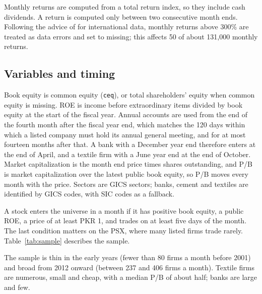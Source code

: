 \documentclass[11pt]{article}
\begin{document}
Monthly returns are computed from a total return index, so they include cash dividends. A return
is computed only between two consecutive month ends. Following the advice of \citet{inceporter2006}
for international data, monthly returns above 300\% are treated as data errors and set to missing;
this affects 50 of about 131,000 monthly returns.

\subsection{Variables and timing}

Book equity is common equity (\texttt{ceq}), or total shareholders' equity when common equity is
missing. ROE is income before extraordinary items divided by book equity at the start of the fiscal
year. Annual accounts are used from the end of the fourth month after the fiscal year end, which
matches the 120 days within which a listed company must hold its annual general meeting, and for at most fourteen months after that. A bank
with a December year end therefore enters at the end of April, and a textile firm with a June year
end at the end of October. Market capitalization is the month end price times shares outstanding,
and P/B is market capitalization over the latest public book equity, so P/B moves every month with
the price. Sectors are GICS sectors; banks, cement and textiles are identified by GICS codes, with
SIC codes as a fallback.

A stock enters the universe in a month if it has positive book equity, a public ROE, a price of at
least PKR 1, and trades on at least five days of the month. The last condition matters on the PSX,
where many listed firms trade rarely. Table~\ref{tab:sample} describes the sample.

\begin{table}[htbp]
\centering\small
\caption{Sample. Firms is the number of distinct firms that ever enter the universe; delisted is
the number of those firms that are inactive in Compustat today. Firms per month is the average
number in the universe. Medians are over all firm months. Size is market capitalization in millions
of rupees.}
\label{tab:sample}
\footnotesize

\end{table}

The sample is thin in the early years (fewer than 80 firms a month before 2001) and broad from
2012 onward (between 237 and 406 firms a month). Textile firms are numerous, small and cheap, with a median P/B
of about half; banks are large and few.
\end{document}

